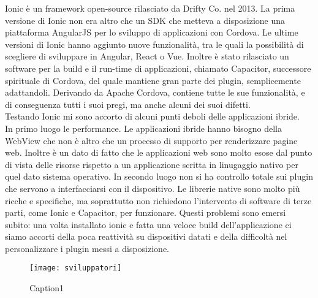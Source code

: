 Ionic è un framework open-source rilasciato da Drifty Co. nel 2013. La prima versione di Ionic non era altro che un SDK
che metteva a disposizione una piattaforma AngularJS per lo sviluppo di applicazioni con Cordova. Le ultime versioni di
Ionic hanno aggiunto nuove funzionalità, tra le quali la possibilità di scegliere di sviluppare in Angular, React o Vue.
Inoltre è stato rilasciato un software per la build e il run-time di applicazioni, chiamato Capacitor, successore
spirituale di Cordova, del quale mantiene gran parte dei plugin, semplicemente adattandoli. Derivando da Apache
Cordova, contiene tutte le sue funzionalità, e di conseguenza tutti i suoi pregi, ma anche alcuni dei suoi difetti. \\
Testando Ionic mi sono accorto di alcuni punti deboli delle applicazioni ibride. \\
In primo luogo le performance. Le applicazioni ibride hanno bisogno della WebView che non è altro che un processo
di supporto per renderizzare pagine web. Inoltre è un dato di fatto che le applicazioni web sono molto esose dal punto
di vista delle risorse rispetto a un applicazione scritta in linugaggio nativo per quel dato sistema operativo. In
secondo luogo non si ha controllo totale sui plugin che servono a interfacciarsi con il dispositivo. Le librerie native
sono molto più ricche e specifiche, ma soprattutto non richiedono l'intervento di software di terze parti, come Ionic e
Capacitor, per funzionare. Questi problemi sono emersi subito: una volta installato ionic e fatta una veloce build
dell'applicazione ci siamo accorti della poca reattività su dispositivi datati e della difficoltà nel personalizzare i
plugin messi a disposizione. \\

\begin{wrapfigure}{l}{0.45\textwidth}
  \texttt{[image: sviluppatori]} 
  \caption{Caption1}
  \label{fig:sviluppatori}
\end{wrapfigure}

